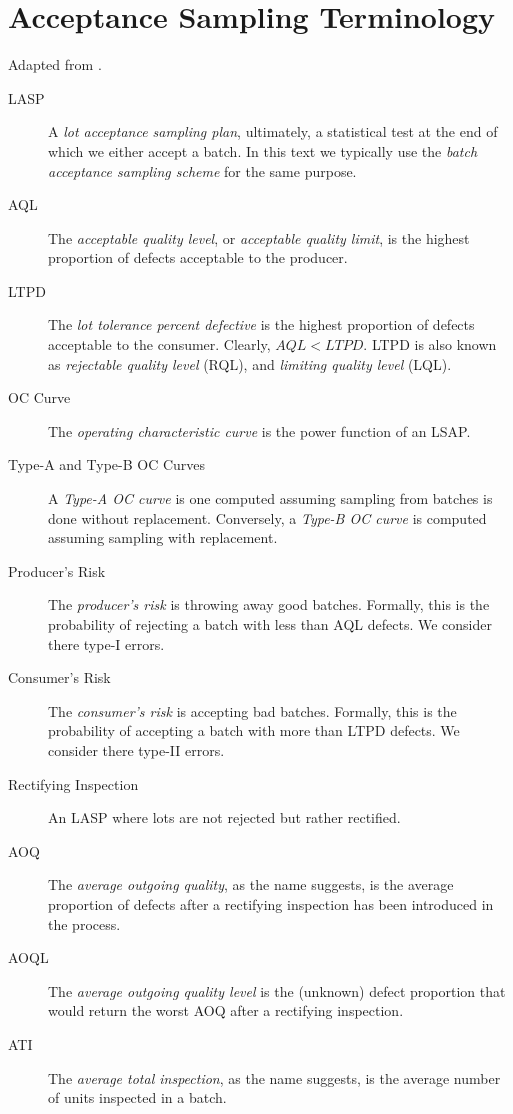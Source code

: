 \section{Acceptance Sampling Terminology}
Adapted from \cite{natrella_nist/sematech_2010}.
\begin{description}
\item [LASP] A \emph{lot acceptance sampling plan}, ultimately, a statistical test at the end of which we either accept a batch. In this text we typically use the \emph{batch acceptance sampling scheme} for the same purpose. 
\item [AQL] The \emph{acceptable quality level}, or \emph{acceptable quality limit}, is the highest proportion of defects acceptable to the producer. 
\item [LTPD] The \emph{lot tolerance percent defective} is the highest proportion of defects acceptable to the consumer. Clearly, $AQL<LTPD$. LTPD is also known as \emph{rejectable quality level} (RQL), and \emph{ limiting quality level} (LQL). 
\item [OC Curve] The \emph{operating characteristic curve} is the power function of an LSAP.
\item [Type-A and Type-B OC Curves] A \emph{Type-A OC curve} is one computed assuming sampling from batches is done without replacement. Conversely, a \emph{Type-B OC curve} is computed assuming sampling with replacement.
\item [Producer's Risk] The \emph{producer's risk} is throwing away good batches. Formally, this is the probability of rejecting a batch with less than AQL defects. We consider there type-I errors.
\item [Consumer's Risk] The \emph{consumer's risk} is accepting bad batches. Formally, this is the probability of accepting a batch with more than LTPD defects. We consider there type-II errors.
\item [Rectifying Inspection] An LASP where lots are not rejected but rather rectified. 
\item [AOQ] The \emph{average outgoing quality}, as the name suggests, is the average proportion of defects after a rectifying inspection has been introduced in the process. 
\item [AOQL] The \emph{average outgoing quality level} is the (unknown) defect proportion that would return the worst AOQ after a rectifying inspection.
\item [ATI] The \emph{average total inspection}, as the name suggests, is the average number of units inspected in a batch.
\end{description}



